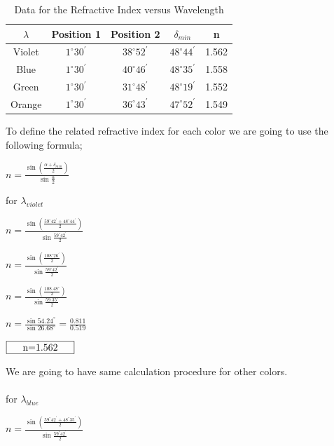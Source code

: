\documentclass[a4paper,12pt]{report}
\begin{document}
\begin{table}[h]
\begin{center}
	\begin{tabular}{|c|c|c|c|c|}
	\hline $\lambda$ & Position 1 & Position 2 & $\delta_{min}$ & n \\ 
	\hline Violet & $1^{\circ}30^{\prime}$ & $38^{\circ}52^{\prime}$ & $48^{\circ}44^{\prime}$ & 1.562 \\ 
	\hline Blue & $1^{\circ}30^{\prime}$ & $40^{\circ}46^{\prime}$ & $48^{\circ}35^{\prime}$ & 1.558 \\ 
	\hline Green & $1^{\circ}30^{\prime}$ & $31^{\circ}48^{\prime}$ & $48^{\circ}19^{\prime}$ & 1.552 \\ 
	\hline Orange & $1^{\circ}30^{\prime}$ & $36^{\circ}43^{\prime}$ & $47^{\circ}52^{\prime}$ & 1.549 \\ 
	\hline 
\end{tabular} 
\end{center}
\caption{Data for the Refractive Index versus Wavelength}
\end{table}
To define the related refractive index for each color we are going to use the following formula;
\begin{center}
	{\large $n=\frac{\sin(\frac{\alpha+\delta_{min}}{2})}{\sin\frac{\alpha}{2}}$}
\end{center}
for $\lambda_{violet}$
\begin{center}
{\large 	$n=\frac{\sin(\frac{59^{\circ}42^{\prime}+48^{\circ}44^{\prime}}{2})}{\sin\frac{59^{\circ}42^{\prime}}{2}}$}
\end{center}
\begin{center}
	{\large 	$n=\frac{\sin(\frac{108^{\circ}26^{\prime}}{2})}{\sin\frac{59^{\circ}42^{\prime}}{2}}$}
\end{center}
\begin{center}
	{\large 	$n=\frac{\sin(\frac{108.48^{\circ}}{2})}{\sin\frac{59.35^{\circ}}{2}}$}
\end{center}
\begin{center}
	{\large 	$n=\frac{\sin54.24^{\circ}}{\sin26.68^{\circ}}=\frac{0.811}{0.519}$}
\end{center}
\begin{center}
	$\framebox[70pt]{n=1.562}$
\end{center}
We are going to have same calculation procedure for other colors.\\\\
for $\lambda_{blue}$
\begin{center}
	{\large 	$n=\frac{\sin(\frac{59^{\circ}42^{\prime}+48^{\circ}35^{\prime}}{2})}{\sin\frac{59^{\circ}42^{\prime}}{2}}$}
\end{center}
\end{document}
